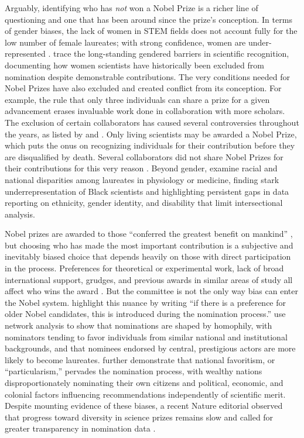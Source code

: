 \documentclass[11pt]{article}
\begin{document}
Arguably, identifying who has \textit{not} won a Nobel Prize is a richer line of questioning and one that has been around since the prize's conception. In terms of gender biases, the lack of women in STEM fields does not account fully for the low number of female laureates; with strong confidence, women are under-represented \citep{LunJenJau2019}. \citet{ModGilSha2018} trace the long-standing gendered barriers in scientific recognition, documenting how women scientists have historically been excluded from nomination despite demonstrable contributions. The very conditions needed for Nobel Prizes have also excluded and created conflict from its conception. For example, the rule that only three individuals can share a prize for a given advancement erases invaluable work done in collaboration with more scholars. The exclusion of certain collaborators has caused several controversies throughout the years, as listed by \citet{CasFan2013} and \citet{Led2016}. Only living scientists may be awarded a Nobel Prize, which puts the onus on recognizing individuals for their contribution before they are disqualified by death. Several collaborators did not share Nobel Prizes for their contributions for this very reason \citep{CasFan2013}. Beyond gender, \citet{NeiVueVue2024} examine racial and national disparities among laureates in physiology or medicine, finding stark underrepresentation of Black scientists and highlighting persistent gaps in data reporting on ethnicity, gender identity, and disability that limit intersectional analysis.

Nobel prizes are awarded to those ``conferred the greatest benefit on mankind'' \citep{nobelwill}, but choosing who has made the most important contribution is a subjective and inevitably biased choice that depends heavily on those with direct participation in the process. Preferences for theoretical or experimental work, lack of broad international support, grudges, and previous awards in similar areas of study all affect who wins the award \citep{But2016, Cra2001, CasFan2013}. But the committee is not the only way bias can enter the Nobel system. \citet{BafVam2011} highlight this nuance by writing ``if there is a preference for older Nobel candidates, this is introduced during the nomination process.'' \citet{GalDom2019} use network analysis to show that nominations are shaped by homophily, with nominators tending to favor individuals from similar national and institutional backgrounds, and that nominees endorsed by central, prestigious actors are more likely to become laureates. \citet{KoJanYan2024} further demonstrate that national favoritism, or ``particularism,'' pervades the nomination process, with wealthy nations disproportionately nominating their own citizens and political, economic, and colonial factors influencing recommendations independently of scientific merit. Despite mounting evidence of these biases, a recent Nature editorial observed that progress toward diversity in science prizes remains slow and called for greater transparency in nomination data \citep{Nature2022}.
\end{document}

